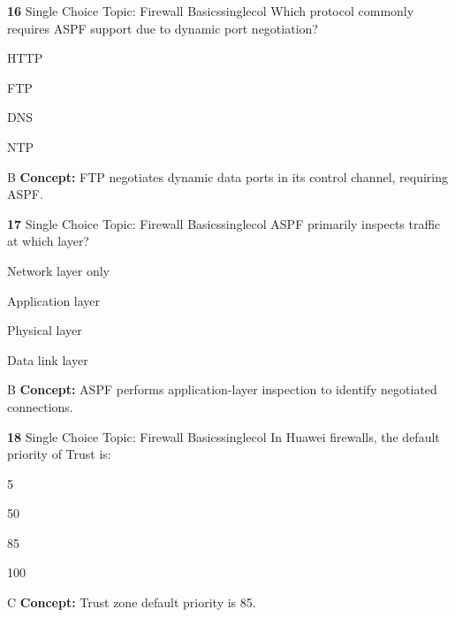 \documentclass[10pt,a4paper]{article}
\begin{document}
\begin{qcard}{\color{white}\textbf{16} \hfill \small Single Choice \textbar{} Topic: Firewall Basics}{singlecol}
Which protocol commonly requires ASPF support due to dynamic port negotiation?

\begin{qoptions}
\item HTTP
\item FTP
\item DNS
\item NTP
\end{qoptions}
\begin{explainbox}{B}
\textbf{Concept:} FTP negotiates dynamic data ports in its control channel, requiring ASPF.
\end{explainbox}
\end{qcard}

\begin{qcard}{\color{white}\textbf{17} \hfill \small Single Choice \textbar{} Topic: Firewall Basics}{singlecol}
ASPF primarily inspects traffic at which layer?

\begin{qoptions}
\item Network layer only
\item Application layer
\item Physical layer
\item Data link layer
\end{qoptions}
\begin{explainbox}{B}
\textbf{Concept:} ASPF performs application-layer inspection to identify negotiated connections.
\end{explainbox}
\end{qcard}

\begin{qcard}{\color{white}\textbf{18} \hfill \small Single Choice \textbar{} Topic: Firewall Basics}{singlecol}
In Huawei firewalls, the default priority of Trust is:

\begin{qoptions}
\item 5
\item 50
\item 85
\item 100
\end{qoptions}
\begin{explainbox}{C}
\textbf{Concept:} Trust zone default priority is 85.
\end{explainbox}
\end{qcard}
\end{document}
